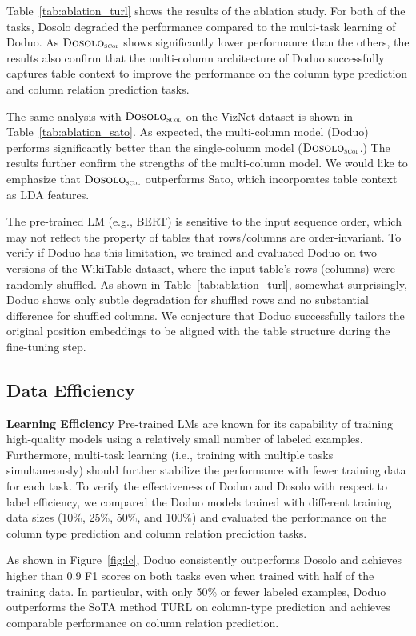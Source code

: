 \documentclass[sigconf]{acmart}
\newcommand{\name}{\mbox{\sc Doduo}}
\newcommand{\namest}{\mbox{\sc Dosolo}}
\newcommand{\namesc}{${\text{\mbox{\sc Dosolo}}}_{\text{\tiny {\sc SCol}}}$}
\newcommand{\hll}[1]{#1}
\newcommand{\rev}[1]{#1}
\begin{document}
Table~\ref{tab:ablation_turl} shows the results of the ablation study. For both of the tasks, \namest{} degraded the performance compared to the multi-task learning of \name. 
%
As \namesc{} shows significantly lower performance than the others, the results also confirm that the multi-column architecture of \name{} successfully captures table context to improve the performance on the column type prediction and column relation prediction tasks.
%


The same analysis with \namesc{} on the VizNet dataset is shown in Table~\ref{tab:ablation_sato}.
%
As expected, the multi-column model (\name) performs significantly better than the single-column model (\namesc.) The results further confirm the strengths of the multi-column model. We would like to emphasize that \namesc{} outperforms Sato, which incorporates table context as LDA features.
%


\rev{The pre-trained LM (e.g., BERT) is sensitive to the input sequence order, which may not reflect the property of tables that rows/columns are order-invariant. To verify if \name{} has this limitation, we trained and evaluated \name{} on two versions of the WikiTable dataset, where the input table's rows (columns) were randomly shuffled. As shown in Table~\ref{tab:ablation_turl}, somewhat surprisingly, \name{} shows only subtle degradation for shuffled rows and no substantial difference for shuffled columns. We conjecture that \name{} successfully tailors the original position embeddings to be aligned with the table structure during the fine-tuning step.}


\subsection{Data Efficiency}
\noindent
{\bf Learning Efficiency} 
\hll{Pre-trained LMs are known for its capability of training high-quality models using a relatively small number of labeled examples.}
Furthermore, multi-task learning (i.e., training with \hll{multiple tasks simultaneously})
should further stabilize the performance with fewer training data for each task.
%
To verify the effectiveness of \name{} \rev{and \namest{}} with respect to \hll{label efficiency,}
we compared the \name{} models trained with different training data sizes (10\%, 25\%, 50\%, and 100\%) and evaluated the performance on the column type prediction and column relation prediction tasks. 

As shown in Figure~\ref{fig:lc}, \name{} \rev{consistently outperforms \namest{} and}
achieves higher than 0.9 F1 scores on both tasks even when trained with half of the training data.
\hll{In particular, with only 50\% or fewer labeled examples, \name{} outperforms the SoTA method TURL on column-type prediction and achieves comparable performance on column relation prediction.}
\end{document}

